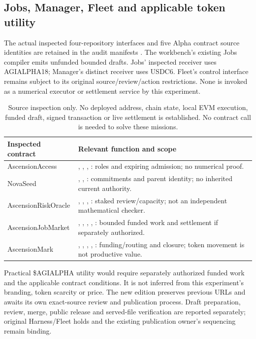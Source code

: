 \subsection{Jobs, Manager, Fleet and applicable token utility}

The actual inspected four-repository interfaces and five Alpha contract source identities are retained in the
audit manifests \citep{alphaContracts,alphaCoordination}. The workbench's existing Jobs compiler emits unfunded
bounded drafts. Jobs' inspected receiver uses AGIALPHA18; Manager's distinct receiver uses USDC6. Fleet's
control interface remains subject to its original source/review/action restrictions. None is invoked as a
numerical executor or settlement service by this experiment.

\begin{table}[ht]\centering\small
\begin{tabularx}{\linewidth}{L{32mm}Y}
\toprule
Inspected contract & Relevant function and scope \\
\midrule
AscensionAccess & , , , : roles and expiring admission; no numerical proof. \\
NovaSeed & , , : commitments and parent identity; no inherited current authority. \\
AscensionRiskOracle & , , , : staked review/capacity; not an independent mathematical checker. \\
AscensionJobMarket & , , , , : bounded funded work and settlement if separately authorized. \\
AscensionMark & , , , , : funding/routing and closure; token movement is not productive value. \\
\bottomrule
\end{tabularx}
\caption{Source inspection only. No deployed address, chain state, local EVM execution, funded draft, signed transaction or live settlement is established. No contract call is needed to solve these missions.}
\end{table}

Practical \$AGIALPHA utility would require separately authorized funded work and the applicable contract
conditions. It is not inferred from this experiment's branding, token scarcity or price. The new edition
preserves previous URLs and awaits its own exact-source review and publication process. Draft preparation,
review, merge, public release and served-file verification are reported separately; original Harness/Fleet
holds and the existing publication owner's sequencing remain binding.
